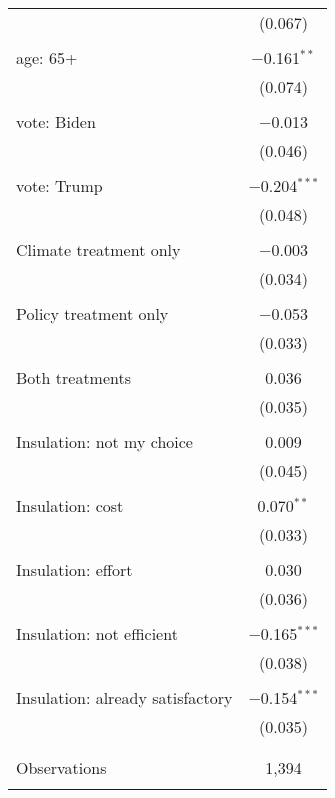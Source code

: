 \begin{tabular}{@{\extracolsep{5pt}}lc}
  & (0.067) \\ 
  & \\ 
 age: 65+ & $-$0.161$^{**}$ \\ 
  & (0.074) \\ 
  & \\ 
 vote: Biden & $-$0.013 \\ 
  & (0.046) \\ 
  & \\ 
 vote: Trump & $-$0.204$^{***}$ \\ 
  & (0.048) \\ 
  & \\ 
 Climate treatment only & $-$0.003 \\ 
  & (0.034) \\ 
  & \\ 
 Policy treatment only & $-$0.053 \\ 
  & (0.033) \\ 
  & \\ 
 Both treatments & 0.036 \\ 
  & (0.035) \\ 
  & \\ 
 Insulation: not my choice & 0.009 \\ 
  & (0.045) \\ 
  & \\ 
 Insulation: cost & 0.070$^{**}$ \\ 
  & (0.033) \\ 
  & \\ 
 Insulation: effort & 0.030 \\ 
  & (0.036) \\ 
  & \\ 
 Insulation: not efficient & $-$0.165$^{***}$ \\ 
  & (0.038) \\ 
  & \\ 
 Insulation: already satisfactory & $-$0.154$^{***}$ \\ 
  & (0.035) \\ 
  & \\ 
\hline \\[-1.8ex] 

Observations & 1,394 \\ 
\hline 
\hline \\[-1.8ex] 
\end{tabular} 